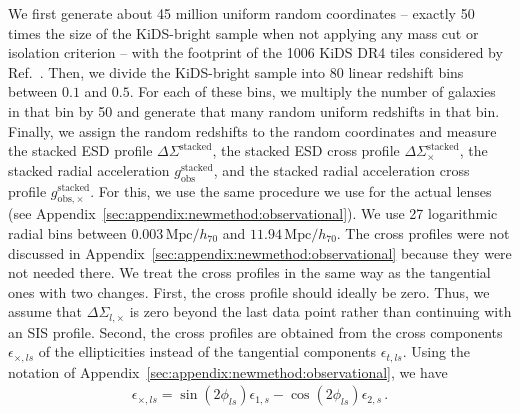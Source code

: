 \documentclass[a4paper,11pt]{article}
\begin{document}
We first generate about 45 million uniform random coordinates -- exactly 50 times the size of the KiDS-bright sample when not applying any mass cut or isolation criterion -- with the footprint of the 1006 KiDS DR4 tiles considered by Ref.~\cite{Brouwer2021}.
Then, we divide the KiDS-bright sample into 80 linear redshift bins between $0.1$ and $0.5$.
For each of these bins, we multiply the number of galaxies in that bin by 50 and generate that many random uniform redshifts in that bin.
Finally, we assign the random redshifts to the random coordinates and measure the stacked ESD profile $\Delta \Sigma^{\mathrm{stacked}}$, the stacked ESD cross profile $\Delta \Sigma^{\mathrm{stacked}}_\times$, the stacked radial acceleration $g_{\mathrm{obs}}^{\mathrm{stacked}}$, and the stacked radial acceleration cross profile $g_{\mathrm{obs},\times}^{\mathrm{stacked}}$.
For this, we use the same procedure we use for the actual lenses (see Appendix~\ref{sec:appendix:newmethod:observational}).
We use 27 logarithmic radial bins between $0.003\,\mathrm{Mpc}/h_{70}$ and $11.94\,\mathrm{Mpc}/h_{70}$.
The cross profiles were not discussed in Appendix~\ref{sec:appendix:newmethod:observational} because they were not needed there.
We treat the cross profiles in the same way as the tangential ones with two changes.
First, the cross profile should ideally be zero.
Thus, we assume that $\Delta \Sigma_{l,\times}$ is zero beyond the last data point rather than continuing with an SIS profile.
Second, the cross profiles are obtained from the cross components $\epsilon_{\times,ls}$ of the ellipticities instead of the  tangential components $\epsilon_{t,ls}$.
Using the notation of Appendix~\ref{sec:appendix:newmethod:observational}, we have
\begin{align}
 \epsilon_{\times,ls} = \sin(2\phi_{ls}) \epsilon_{1,s} - \cos(2 \phi_{ls}) \epsilon_{2,s} \,.
\end{align}
\end{document}
